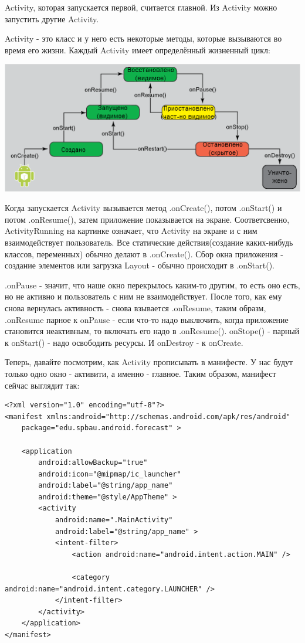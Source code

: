 \documentclass[12 pt]{article}
\begin{document}
    Activity, которая запускается первой, считается главной. Из Activity можно запустить другие Activity.

    Activity - это класс и у него есть некоторые методы, которые вызываются во время его жизни. Каждый Activity имеет определённый жизненный цикл:

	\includegraphics{LifeCycle.png}
	
	Когда запускается Activity вызывается метод .onCreate(), потом .onStart() и потом .onResume(), затем приложение показывается на экране. Соответсвенно, ActivityRunning на картинке означает, что Activity на экране и с ним взаимодействует пользователь. Все статические действия(создание каких-нибудь классов, переменных) обычно делают в .onCreate(). Сбор окна приложения - создание элементов или загрузка Layout - обычно происходит в .onStart().
	
	.onPause - значит, что наше окно перекрылось каким-то другим, то есть оно есть, но не активно и пользователь с ним не взаимодействует. После того, как ему снова вернулась активность - снова взывается .onResume, таким образм, .onResume парное к onPause - если что-то надо выключить, когда приложение становится неактивным, то включать его надо в .onResume(). onStope() - парный к onStart() - надо освободить ресурсы. И onDestroy - к onCreate.
	
	Теперь, давайте посмотрим, как Activity прописывать в манифесте. У нас будут только одно окно - активити, а именно - главное. Таким образом, манифест сейчас выглядит так:
	
	\begin{lstlisting}
<?xml version="1.0" encoding="utf-8"?>
<manifest xmlns:android="http://schemas.android.com/apk/res/android"
    package="edu.spbau.android.forecast" >

    <application
        android:allowBackup="true"
        android:icon="@mipmap/ic_launcher"
        android:label="@string/app_name"
        android:theme="@style/AppTheme" >
        <activity
            android:name=".MainActivity"
            android:label="@string/app_name" >
            <intent-filter>
                <action android:name="android.intent.action.MAIN" />

                <category android:name="android.intent.category.LAUNCHER" />
            </intent-filter>
        </activity>    
    </application>
</manifest>
    \end{lstlisting}
    
\end{document}

